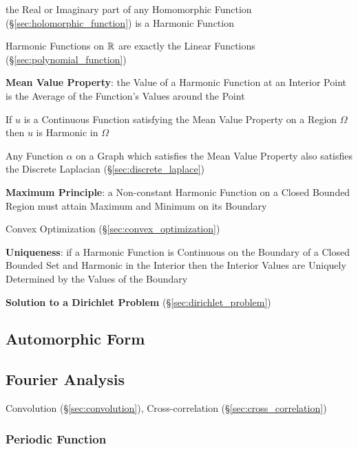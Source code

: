 the Real or Imaginary part of any Homomorphic Function
(\S\ref{sec:holomorphic_function}) is a Harmonic Function

Harmonic Functions on $\mathbb{R}$ are exactly the Linear Functions
(\S\ref{sec:polynomial_function})


\textbf{Mean Value Property}: the Value of a Harmonic Function at an
Interior Point is the Average of the Function's Values around the
Point

If $u$ is a Continuous Function satisfying the Mean Value Property on
a Region $\Omega$ then $u$ is Harmonic in $\Omega$

Any Function $\alpha$ on a Graph which satisfies the Mean Value
Property also satisfies the Discrete Laplacian
(\S\ref{sec:discrete_laplace})


\textbf{Maximum Principle}: a Non-constant Harmonic Function on a
Closed Bounded Region must attain Maximum and Minimum on its Boundary

Convex Optimization (\S\ref{sec:convex_optimization})


\textbf{Uniqueness}: if a Harmonic Function is Continuous on the
Boundary of a Closed Bounded Set and Harmonic in the Interior then the
Interior Values are Uniquely Determined by the Values of the Boundary


\textbf{Solution to a Dirichlet Problem}
(\S\ref{sec:dirichlet_problem})



\subsection{Automorphic Form}\label{sec:automorphic_form}

\subsection{Fourier Analysis}\label{sec:fourier_analysis}

\fist Convolution (\S\ref{sec:convolution}), Cross-correlation
(\S\ref{sec:cross_correlation})



\subsubsection{Periodic Function}\label{sec:periodic_function}

